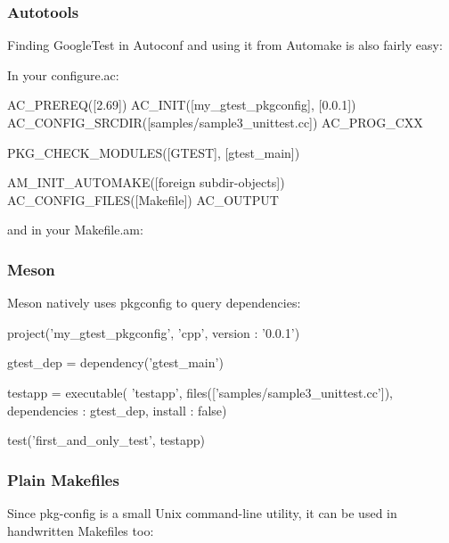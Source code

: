 \subsubsection*{Autotools}

Finding Google\+Test in Autoconf and using it from Automake is also fairly easy\+:

In your {\ttfamily configure.\+ac}\+:


\begin{DoxyCode}
AC\_PREREQ([2.69])
AC\_INIT([my\_gtest\_pkgconfig], [0.0.1])
AC\_CONFIG\_SRCDIR([samples/sample3\_unittest.cc])
AC\_PROG\_CXX

PKG\_CHECK\_MODULES([GTEST], [gtest\_main])

AM\_INIT\_AUTOMAKE([foreign subdir-objects])
AC\_CONFIG\_FILES([Makefile])
AC\_OUTPUT
\end{DoxyCode}


and in your {\ttfamily Makefile.\+am}\+:




\subsubsection*{Meson}

Meson natively uses pkgconfig to query dependencies\+:


\begin{DoxyCode}
project('my\_gtest\_pkgconfig', 'cpp', version : '0.0.1')

gtest\_dep = dependency('gtest\_main')

testapp = executable(
  'testapp',
  files(['samples/sample3\_unittest.cc']),
  dependencies : gtest\_dep,
  install : false)

test('first\_and\_only\_test', testapp)
\end{DoxyCode}


\subsubsection*{Plain Makefiles}

Since {\ttfamily pkg-\/config} is a small Unix command-\/line utility, it can be used in handwritten {\ttfamily Makefile}s too\+:


